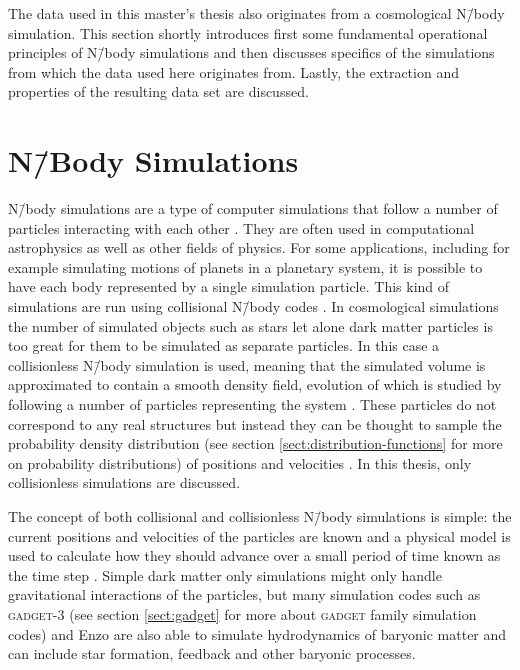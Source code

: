 \documentclass[english, twoside]{HYgradu}
\begin{document}
The data used in this master's thesis also originates from a cosmological N\=/body simulation. This section shortly introduces first some fundamental operational principles of N\=/body simulations and then discusses specifics of the simulations from which the data used here originates from. Lastly, the extraction and properties of the resulting data set are discussed.


\section{N\=/Body Simulations}
N\=/body simulations are a type of computer simulations that follow a number of particles interacting with each other \citep{binney2008galactic}. They are often used in computational astrophysics as well as other fields of physics. For some applications, including for example simulating motions of planets in a planetary system, it is possible to have each body represented by a single simulation particle. This kind of simulations are run using collisional N\=/body codes \citep{binney2008galactic}. In cosmological simulations the number of simulated objects such as stars let alone dark matter particles is too great for them to be simulated as separate particles. In this case a collisionless N\=/body simulation is used, meaning that the simulated volume is approximated to contain a smooth density field, evolution of which is studied by following a number of particles representing the system \citep{binney2008galactic}. These particles do not correspond to any real structures but instead they can be thought to sample the probability density distribution (see section \ref{sect:distribution-functions} for more on probability distributions) of positions and velocities \citep{binney2008galactic}. In this thesis, only collisionless simulations are discussed.

The concept of both collisional and collisionless N\=/body simulations is simple: the current positions and velocities of the particles are known and a physical model is used to calculate how they should advance over a small period of time known as the time step \citep{binney2008galactic}. Simple dark matter only simulations might only handle gravitational interactions of the particles, but many simulation codes such as \textsc{gadget-3} \citep{springel2005cosmological} (see section \ref{sect:gadget} for more about \textsc{gadget} family simulation codes) and Enzo \citep{norman2007simulating} are also able to simulate hydrodynamics of baryonic matter and can include star formation, feedback and other baryonic processes.
\end{document}
